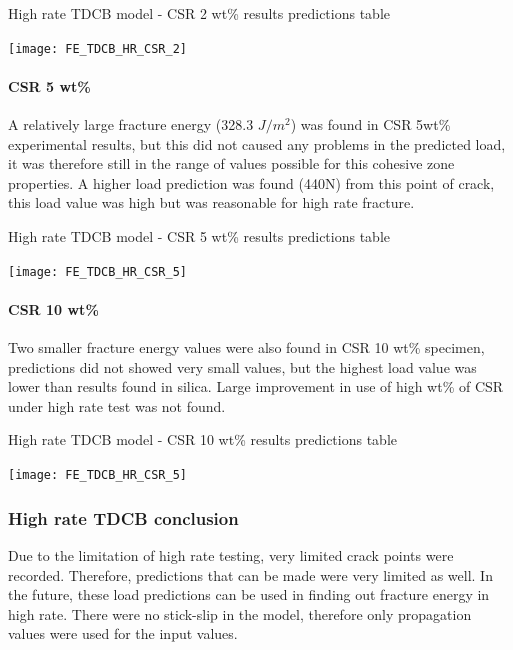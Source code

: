 \documentclass[numbers=noendperiod,chapterprefix=on]{icldt} %
\begin{document}
 \begin{table}[!htpb]
     \centering
     \caption{High rate TDCB model - CSR 2 wt\% results predictions table}\label{FE_TDCB_HR_CSR_2}
     \texttt{[image: FE\_TDCB\_HR\_CSR\_2]}
     \end{table}
     \FloatBarrier   
     
\paragraph{CSR 5 wt\%}      
 A relatively large fracture energy (328.3 $ J/m^{2} $) was found in CSR 5wt\% experimental results, but this did not caused any problems in the predicted load, it was therefore still in the range of values possible for this cohesive zone properties. A higher load prediction was found (440N) from this point of crack, this load value was high but was reasonable for high rate fracture.  
   
 \begin{table}[!htpb]
        \centering
        \caption{High rate TDCB model - CSR 5 wt\% results predictions table}\label{FE_TDCB_HR_CSR_5}
        \texttt{[image: FE\_TDCB\_HR\_CSR\_5]}
        \end{table}
        \FloatBarrier      

\paragraph{CSR 10 wt\%}  
 Two smaller fracture energy values were also found in CSR 10 wt\% specimen, predictions did not showed very small values, but the highest load value was lower than results found in silica.  Large improvement in use of high wt\% of CSR under high rate test was not found.   
     
  \begin{table}[!htpb]
   \centering
   \caption{High rate TDCB model - CSR 10 wt\% results predictions table}\label{FE_TDCB_HR_CSR_10}
   \texttt{[image: FE\_TDCB\_HR\_CSR\_5]}
   \end{table}
   \FloatBarrier    
       
\subsubsection{High rate TDCB conclusion}     
Due to the limitation of high rate testing, very limited crack points were recorded. Therefore, predictions that can be made were very limited as well.
In the future, these load predictions can be used in finding out fracture energy in high rate.
There were no stick-slip in the model, therefore only propagation values were used for the input values.    
\end{document}
